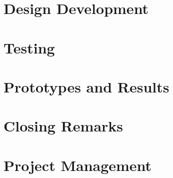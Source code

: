 \documentclass[en, screen, 12pt]{report}
\begin{document}
\chapter{Design Development}







\chapter{Testing}





\chapter{Prototypes and Results}

\chapter{Closing Remarks}


\chapter{Project Management}

\appendix



\newpage
\printbibliography
\end{document}
